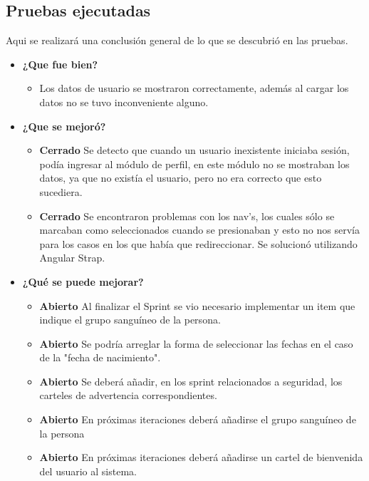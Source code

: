 \subsection{Pruebas ejecutadas}
Aqui se realizará una conclusión general de lo que se descubrió en las pruebas.
	\begin{itemize}
		\item \textbf{¿Que fue bien?}
        	\begin{itemize}
				\item Los datos de usuario se mostraron correctamente, además al cargar  los datos no se tuvo inconveniente alguno.
			\end{itemize}
   		\item \textbf{¿Que se mejoró?}
        	\begin{itemize}
				\item \textbf{Cerrado}  Se detecto que cuando un usuario inexistente iniciaba sesión, podía ingresar al módulo de perfil, en este módulo no se mostraban los datos, ya que no existía  el usuario, pero no era correcto que esto sucediera.
                \item \textbf{Cerrado} Se encontraron problemas  con los nav's, los cuales sólo se marcaban como seleccionados cuando se presionaban y esto no nos servía para los casos en los que había que redireccionar. Se solucionó utilizando Angular Strap.
                
			\end{itemize}
   		\item \textbf{¿Qué se puede mejorar?}
        	\begin{itemize}
				\item \textbf{Abierto} Al finalizar el Sprint se vio necesario implementar un item que indique el grupo sanguíneo de la persona.
                \item \textbf{Abierto} Se podría arreglar la forma de seleccionar las fechas en el caso de la "fecha de nacimiento".
                \item \textbf{Abierto} Se deberá añadir, en los sprint relacionados a seguridad, los carteles de advertencia correspondientes.
                \item \textbf{Abierto} En próximas iteraciones deberá añadirse el grupo sanguíneo de la persona
                \item \textbf{Abierto} En próximas iteraciones deberá añadirse un cartel de bienvenida del usuario al sistema.
			\end{itemize}
    \end{itemize}